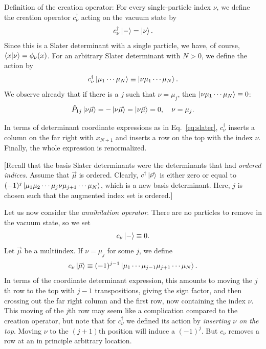 \documentclass{report}
\theoremstyle{plain}
\theoremstyle{definition}
\begin{document}
Definition of the creation operator: For every single-particle index
$\nu$, we define the creation operator $c^\dag_\nu$ acting on the
vacuum state by
\begin{equation}
  c^\dag_\nu \ket{-} = \ket{\nu}.
\end{equation}
Since this is a Slater determinant with a single particle, we have, of
course, $\braket{x|\nu} = \phi_\nu(x)$.
For an arbitrary Slater determinant with $N>0$, we define the action by
\begin{equation}
  c^\dag_\nu\ket{\mu_1\cdots\mu_N} \equiv \ket{\nu\mu_1\cdots\mu_N}.
\end{equation}
We observe already that if there is a $j$ such that $\nu = \mu_j$,
then $\ket{\nu\mu_1\cdots\mu_N} \equiv 0$:
\begin{equation}
  \hat{P}_{1j} \ket{\nu\vec{\mu}} = -\ket{\nu\vec{\mu}} =
  \ket{\nu\vec{\mu}} = 0, \quad \nu = \mu_j.
\end{equation}

In terms of determinant coordinate expressions as in Eq.~\eqref{eq:slater}, $c^\dag_\nu$ inserts a
column on the far right with $x_{N+1}$ and inserts a row on the top
with the index $\nu$. Finally, the whole expression is renormalized.

[Recall that the basis Slater determinants were the determinants that had
\emph{ordered indices}. Assume that $\vec{\mu}$ is ordered. Clearly,
$c^\dag\ket{\vec{\nu}}$ is either zero or equal to
$(-1)^j\ket{\mu_1\mu_2\cdots\mu_j\nu\mu_{j+1}\cdots \mu_N}$, which is
a new basis determinant. Here, $j$ is chosen such that the augmented
index set is ordered.]

Let us now consider the \emph{annihilation operator}. There are no
particles to remove in the vacuum state, so we set
\begin{equation}
  c_\nu \ket{-} \equiv 0.
\end{equation}
Let $\vec{\mu}$ be a multiindex. If $\nu=\mu_j$ for some $j$, we
define
\begin{equation}
  c_\nu \ket{\vec{\mu}} \equiv
  (-1)^{j-1} \ket{\mu_1\cdots\mu_{j-1}\mu_{j+1}\cdots\mu_N}.
\end{equation}
In terms of the coordinate determinant expression, this amounts to
moving the $j$th row to the top with $j-1$ transpositions, giving the sign factor, and
then crossing out the far right column and the first row, now
containing the index $\nu$. This moving of the $j$th row
may seem like a complication compared to the creation operator, but
note that for $c^\dag_\nu$ we defined its action by \emph{inserting
  $\nu$ on the top}. Moving $\nu$ to the $(j+1)$th position will
induce a $(-1)^j$. But $c_\nu$ removes a row at an in principle
arbitrary location.
\end{document}
